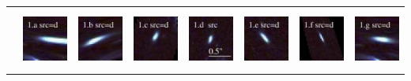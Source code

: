 \documentclass[useAMS,usenatbib]{mn2e}
\begin{document}
\begin{table}
\begin{tabular}{cccccccc}
    & \multicolumn{1}{m{1.7cm}}{\includegraphics[height=2.00cm,clip]{figs/enfw_img/rgb.pre_1_a_d_tri.ps}}
    & \multicolumn{1}{m{1.7cm}}{\includegraphics[height=2.00cm,clip]{figs/enfw_img/rgb.pre_1_b_d_tri.ps}}
    & \multicolumn{1}{m{1.7cm}}{\includegraphics[height=2.00cm,clip]{figs/enfw_img/rgb.pre_1_c_d_tri.ps}}
    & \multicolumn{1}{m{1.7cm}}{\includegraphics[height=2.00cm,clip]{figs/enfw_img/rgb.src_1_d.ps}}
    & \multicolumn{1}{m{1.7cm}}{\includegraphics[height=2.00cm,clip]{figs/enfw_img/rgb.pre_1_e_d_tri.ps}}
    & \multicolumn{1}{m{1.7cm}}{\includegraphics[height=2.00cm,clip]{figs/enfw_img/rgb.pre_1_f_d_tri.ps}}
    & \multicolumn{1}{m{1.7cm}}{\includegraphics[height=2.00cm,clip]{figs/enfw_img/rgb.pre_1_g_d_tri.ps}} \\
  \end{tabular}

\end{table}
\end{document}
